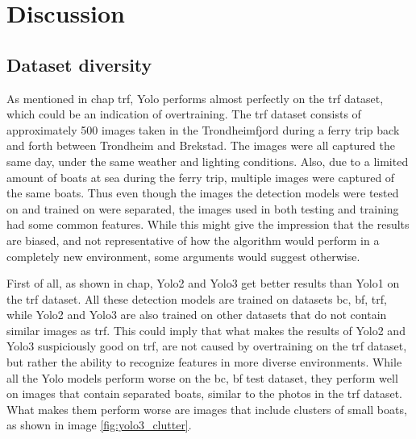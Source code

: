 \chapter{Discussion}

\section{Dataset diversity}
\label{dataset_divers}
As mentioned in chap trf, Yolo performs almost perfectly on the trf dataset, which could be an indication of overtraining. The trf dataset consists of approximately 500 images taken in the Trondheimfjord during a ferry trip back and forth between Trondheim and Brekstad. The images were all captured the same day, under the same weather and lighting conditions. Also, due to a limited amount of boats at sea during the ferry trip, multiple images were captured of the same boats. Thus even though the images the detection models were tested on and trained on were separated, the images used in both testing and training had some common features. While this might give the impression that the results are biased, and not representative of how the algorithm would perform in a completely new environment, some arguments would suggest otherwise.

\vspace{3mm}

First of all, as shown in chap, Yolo2 and Yolo3 get better results than Yolo1 on the trf dataset. All these detection models are trained on datasets bc, bf, trf, while Yolo2 and Yolo3 are also trained on other datasets that do not contain similar images as trf. This could imply that what makes the results of Yolo2 and Yolo3 suspiciously good on trf, are not caused by overtraining on the trf dataset, but rather the ability to recognize features in more diverse environments. While all the Yolo models perform worse on the bc, bf test dataset, they perform well on images that contain separated boats, similar to the photos in the trf dataset. What makes them perform worse are images that include clusters of small boats, as shown in image \ref{fig:yolo3_clutter}. 

